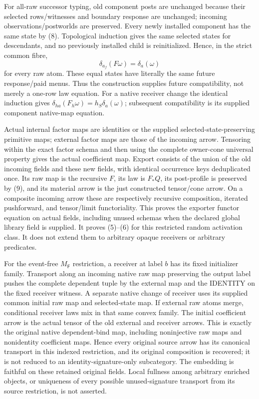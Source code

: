 \documentclass[11pt]{article}\usepackage{amsmath,amssymb,amsthm,geometry}\geometry{margin=1in}
\begin{document}
For all-raw successor typing, old component posts are unchanged because their selected rows/witnesses and boundary response are unchanged; incoming observations/postworlds are preserved. Every newly installed component has the same state by (8). Topological induction gives the same selected states for descendants, and no previously installed child is reinitialized. Hence, in the strict common fibre,
\[
 \delta_{a_f}(F\omega)=\delta_a(\omega)                       \tag{9}
\]
for every raw atom. These equal states have literally the same future response/paid menus. Thus the construction supplies future compatibility, not merely a one-row law equation. For a native receiver change the identical induction gives $\delta_{ha}(F_h\omega)=h_S\delta_a(\omega)$; subsequent compatibility is its supplied component native-map equation.

Actual internal factor maps are identities or the supplied selected-state-preserving primitive maps; external factor maps are those of the incoming arrow. Tensoring within the exact factor schema and then using the complete owner-cone universal property gives the actual coefficient map. Export consists of the union of the old incoming fields and these new fields, with identical occurrence keys deduplicated once. Its raw map is the recursive $F$, its law is $F_*Q$, its post-profile is preserved by (9), and its material arrow is the just constructed tensor/cone arrow. On a composite incoming arrow these are respectively recursive composition, iterated pushforward, and tensor/limit functoriality. This proves the exporter functor equation on actual fields, including unused schemas when the declared global library field is supplied. It proves (5)--(6) for this restricted random activation class. It does not extend them to arbitrary opaque receivers or arbitrary predicates.

For the event-free $M_{\mathsf F}$ restriction, a receiver at label $b$ has its fixed initializer family. Transport along an incoming native raw map preserving the output label pushes the complete dependent tuple by the external map and the IDENTITY on the fixed receiver witness. A separate native change of receiver uses its supplied common initial raw map and selected-state map. If external raw atoms merge, conditional receiver laws mix in that same convex family. The initial coefficient arrow is the actual tensor of the old external and receiver arrows. This is exactly the original native dependent-bind map, including noninjective raw maps and nonidentity coefficient maps. Hence every original source arrow has its canonical transport in this indexed restriction, and its original composition is recovered; it is not reduced to an identity-signature-only subcategory. The embedding is faithful on these retained original fields. Local fullness among arbitrary enriched objects, or uniqueness of every possible unused-signature transport from its source restriction, is not asserted.
\end{document}
